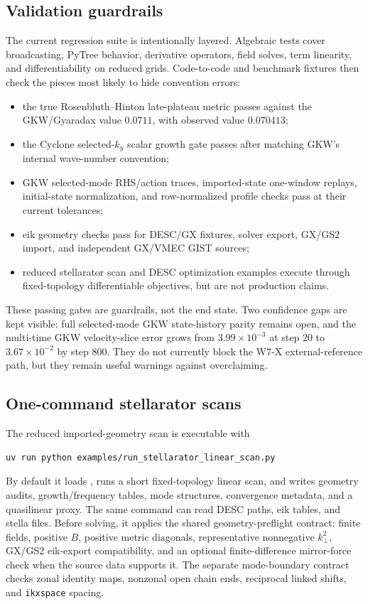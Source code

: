 \documentclass[11pt,a4paper]{article}
\begin{document}
\subsection{Validation guardrails}

The current regression suite is intentionally layered.  Algebraic tests cover
broadcasting, PyTree behavior, derivative operators, field solves, term
linearity, and differentiability on reduced grids.  Code-to-code and benchmark
fixtures then check the pieces most likely to hide convention errors:
\begin{itemize}
  \item the true Rosenbluth--Hinton late-plateau metric passes against the
  GKW/Gyaradax value \(0.0711\), with observed value \(0.070413\);
  \item the Cyclone selected-\(k_y\) scalar growth gate passes after matching
  GKW's internal wave-number convention;
  \item GKW selected-mode RHS/action traces, imported-state one-window replays,
  initial-state normalization, and row-normalized 
  profile checks pass at their current tolerances;
  \item eik geometry checks pass for DESC/GX fixtures, solver export, GX/GS2
  import, and independent GX/VMEC GIST sources;
  \item reduced stellarator scan and DESC optimization examples execute through
  fixed-topology differentiable objectives, but are not production claims.
\end{itemize}

These passing gates are guardrails, not the end state.  Two confidence gaps are
kept visible: full selected-mode GKW state-history parity remains open, and the
multi-time GKW velocity-slice error grows from \(3.99\times10^{-3}\) at step 20
to \(3.67\times10^{-2}\) by step 800.  They do not currently block the W7-X
external-reference path, but they remain useful warnings against overclaiming.

\subsection{One-command stellarator scans}

The reduced imported-geometry scan is executable with
\begin{verbatim}
uv run python examples/run_stellarator_linear_scan.py
\end{verbatim}
By default it loads , runs
a short fixed-topology linear scan, and writes geometry audits, growth/frequency
tables, mode structures, convergence metadata, and a quasilinear proxy.  The
same command can read DESC paths, eik tables, and stella 
files.  Before solving, it applies the shared geometry-preflight contract:
finite fields, positive \(B\), positive metric diagonals, representative
nonnegative \(k_\perp^2\), GX/GS2 eik-export compatibility, and an optional
finite-difference mirror-force check when the source data supports it.  The
separate mode-boundary contract checks zonal identity maps, nonzonal open chain
ends, reciprocal linked shifts, and \texttt{ikxspace} spacing.
\end{document}
